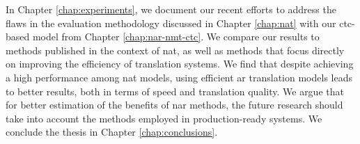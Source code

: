 In Chapter \ref{chap:experiments}, we document our recent efforts to address
the flaws in the evaluation methodology discussed in Chapter \ref{chap:nat}
with our \acs{ctc}-based model from Chapter \ref{chap:nar-nmt-ctc}. We compare
our results to methods published in the context of \ac{nat}, as well as methods
that focus directly on improving the efficiency of translation systems.  We
find that despite achieving a high performance among \ac{nat} models, using
efficient \acl{ar} translation models leads to better results, both in terms of
speed and translation quality. We argue that for better estimation of the
benefits of \acl{nar} methods, the future research should take into account the
methods employed in production-ready systems.
%
We conclude the thesis in Chapter \ref{chap:conclusions}.

